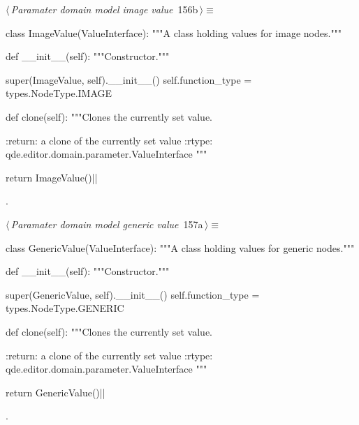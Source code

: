 \documentclass[%
    a4paper,    %
    justified,  %
    nobib,      %
    openany     %
]{tufte-book}
\begin{document}
\begin{flushleft} \small
\begin{minipage}{\linewidth}\label{scrap182}\raggedright\small
{} $\langle\,${\itshape Paramater domain model image value}\nobreak\ {\footnotesize {156b}}$\,\rangle\equiv$
\vspace{-1ex}
\begin{pythoncode}
class ImageValue(ValueInterface):
    """A class holding values for image nodes."""

    def __init__(self):
        """Constructor."""

        super(ImageValue, self).__init__()
        self.function_type = types.NodeType.IMAGE

    def clone(self):
        """Clones the currently set value.

        :return: a clone of the currently set value
        :rtype:  qde.editor.domain.parameter.ValueInterface
        """

        return ImageValue()|\NWsep|
\end{pythoncode}
\vspace{1.5ex}
\footnotesize
\begin{list}{}{\setlength{\itemsep}{-\parsep}\setlength{\itemindent}{-\leftmargin}}
\item {\NWtxtMacroNoRef}.

\item{}
\end{list}
\end{minipage}\vspace{4ex}
\end{flushleft}
\begin{flushleft} \small
\begin{minipage}{\linewidth}\label{scrap183}\raggedright\small
{} $\langle\,${\itshape Paramater domain model generic value}\nobreak\ {\footnotesize {157a}}$\,\rangle\equiv$
\vspace{-1ex}
\begin{pythoncode}
class GenericValue(ValueInterface):
    """A class holding values for generic nodes."""

    def __init__(self):
        """Constructor."""

        super(GenericValue, self).__init__()
        self.function_type = types.NodeType.GENERIC

    def clone(self):
        """Clones the currently set value.

        :return: a clone of the currently set value
        :rtype:  qde.editor.domain.parameter.ValueInterface
        """

        return GenericValue()|\NWsep|
\end{pythoncode}
\vspace{1.5ex}
\footnotesize
\begin{list}{}{\setlength{\itemsep}{-\parsep}\setlength{\itemindent}{-\leftmargin}}
\item {\NWtxtMacroNoRef}.

\item{}
\end{list}
\end{minipage}\vspace{4ex}
\end{flushleft}
\end{document}
